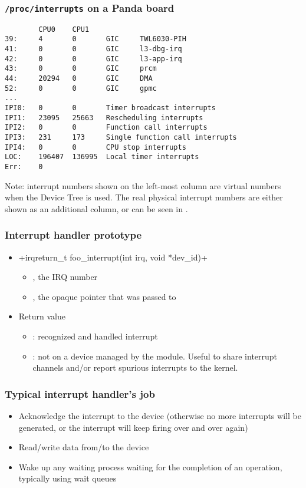 \begin{frame}[fragile]
  \frametitle{{\tt /proc/interrupts} on a Panda board}
\begin{block}{}
  \footnotesize
\begin{verbatim}
        CPU0    CPU1
39:     4       0       GIC     TWL6030-PIH
41:     0       0       GIC     l3-dbg-irq
42:     0       0       GIC     l3-app-irq
43:     0       0       GIC     prcm
44:     20294   0       GIC     DMA
52:     0       0       GIC     gpmc
...
IPI0:   0       0       Timer broadcast interrupts
IPI1:   23095   25663   Rescheduling interrupts
IPI2:   0       0       Function call interrupts
IPI3:   231     173     Single function call interrupts
IPI4:   0       0       CPU stop interrupts
LOC:    196407  136995  Local timer interrupts
Err:    0
\end{verbatim}
\end{block}
  \footnotesize
  Note: interrupt numbers shown on the left-most column are virtual
  numbers when the Device Tree is used. The real physical interrupt
  numbers are either shown as an additional column, or can be seen in
  .
\end{frame}

\begin{frame}[fragile]
  \frametitle{Interrupt handler prototype}
  \begin{itemize}
  \item {}+irqreturn_t foo_interrupt(int irq, void *dev_id)+
    \begin{itemize}
    \item {}, the IRQ number
    \item {}, the opaque pointer that was passed to
    \end{itemize}
  \item Return value
    \begin{itemize}
    \item {}: recognized and handled interrupt
    \item {}: not on a device managed by the
      module. Useful to share interrupt channels and/or report
      spurious interrupts to the kernel.
    \end{itemize}
  \end{itemize}
\end{frame}

\begin{frame}
  \frametitle{Typical interrupt handler's job}
  \begin{itemize}
  \item Acknowledge the interrupt to the device (otherwise no more
    interrupts will be generated, or the interrupt will keep firing
    over and over again)
  \item Read/write data from/to the device
  \item Wake up any waiting process waiting for the completion of an
    operation, typically using wait queues
\end{itemize}
\end{frame}

